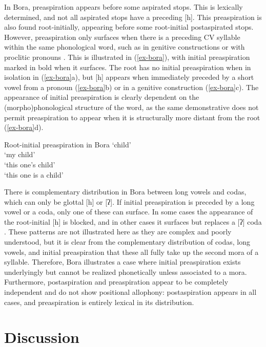 \documentclass[output=paper,colorlinks,citecolor=brown]{langscibook}
\begin{document}
In Bora, preaspiration appears before some aspirated stops. This is lexically determined, and not all aspirated stops have a preceding [h]. This preaspiration is also found root-initially, appearing before some root-initial postaspirated stops. However, preaspiration only surfaces when there is a preceding CV syllable within the same phonological word, such as in genitive constructions or with proclitic pronouns \citep{thiesenweber2012}. This is illustrated in (\ref{ex-bora}), with initial preaspiration marked in bold when it surfaces. The root has no initial preaspiration when in isolation in (\ref{ex-bora}a), but [h] appears when immediately preceded by a short vowel from a pronoun (\ref{ex-bora}b) or in a genitive construction (\ref{ex-bora}c). The appearance of initial preaspiration is clearly dependent on the (morpho)phonological structure of the word, as the same demonstrative does not permit preaspiration to appear when it is structurally more distant from the root (\ref{ex-bora}d).

\ea Root-initial preaspiration in Bora \citep[41, 51]{thiesenweber2012}\label{ex-bora}
	\ea{}\tab `child' \\
	\ex{}\tab `my child' \\
	\ex{}\tab `this one's child' \\
	\ex{}\tab `this one is a child' \\
	\z
\z

There is complementary distribution in Bora between long vowels and codas, which can only be glottal [h] or [ʔ]. If initial preaspiration is preceded by a long vowel or a coda, only one of these can surface. In some cases the appearance of the root-initial [h] is blocked, and in other cases it surfaces but replaces a [ʔ] coda \citep{thiesenweber2012}. These patterns are not illustrated here as they are complex and poorly understood, but it is clear from the complementary distribution of codas, long vowels, and initial preaspiration that these all fully take up the second mora of a syllable. Therefore, Bora illustrates a case where initial preaspiration exists underlyingly but cannot be realized phonetically unless associated to a mora. Furthermore, postaspiration and preaspiration appear to be completely independent and do not show positional allophony: postaspiration appears in all cases, and preaspiration is entirely lexical in its distribution.


\section{Discussion}
\label{sec-discussion}
\end{document}
